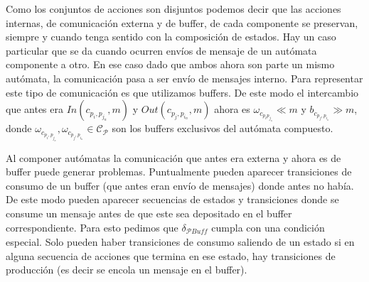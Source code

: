 Como los conjuntos de acciones son disjuntos podemos decir que las acciones internas, de comunicación externa y de buffer, de cada componente se preservan, siempre y cuando tenga sentido con la composición de estados. Hay un caso particular que se da cuando ocurren envíos de mensaje de un autómata componente a otro. En ese caso dado que ambos ahora son parte un mismo autómata, la comunicación pasa a ser envío de mensajes interno. Para representar este tipo de comunicación es que utilizamos buffers. De este modo el intercambio que antes era $\mathit{In} (c_{p_i, p_{j_n}},m)$ y $\mathit{Out}(c_{p_j, p_{i_n}},m)$ ahora es $\omega_{c_{p_i p_{j_n}}}  \ll m$ y $b_{c_{p_j, p_{i_n}}}  \gg  m$, donde $ \omega_{c_{p_i, p_{j_n}}}, \omega_{c_{p_j, p_{i_n}}} \in \mathcal{C}_{\mathcal{P}} $ son los buffers exclusivos del autómata compuesto. 

Al componer autómatas la comunicación que antes era externa y ahora es de buffer puede generar problemas. Puntualmente pueden aparecer transiciones de consumo de un buffer (que antes eran envío de mensajes) donde antes no había. De este modo pueden aparecer secuencias de estados y transiciones donde se consume un mensaje antes de que este sea depositado en el buffer correspondiente. Para esto pedimos que $\delta_\mathit{\mathcal{P}Buff}$ cumpla con una condición especial. Solo pueden haber transiciones de consumo saliendo de un estado si en alguna secuencia de acciones que termina en ese estado, hay transiciones de producción (es decir se encola un mensaje en el buffer).

